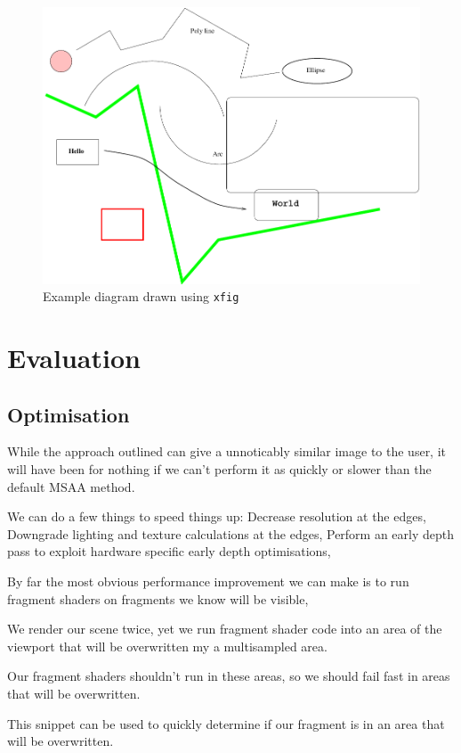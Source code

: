 \documentclass[12pt,a4paper,twoside,openright]{report}
\begin{document}
\begin{figure}[tbh]
\centerline{\includegraphics{figs/diagram.pdf}}
\caption{Example diagram drawn using \texttt{xfig}}
\label{xfig}
\end{figure}


\chapter{Evaluation}

\section{Optimisation}
While the approach outlined can give a unnoticably similar image to the user, it will have been for nothing if we can't perform it as quickly or slower than the default MSAA method. 

We can do a few things to speed things up:
	Decrease resolution at the edges,
	Downgrade lighting and texture calculations at the edges,
	Perform an early depth pass to exploit hardware specific early depth optimisations,
	
By far the most obvious performance improvement we can make is to run fragment shaders on fragments we know will be visible,

We render our scene twice, yet we run fragment shader code into an area of the viewport that will be overwritten my a multisampled area.

Our fragment shaders shouldn't run in these areas, so we should fail fast in areas that will be overwritten.

This snippet can be used to quickly determine if our fragment is in an area that will be overwritten.
\end{document}
